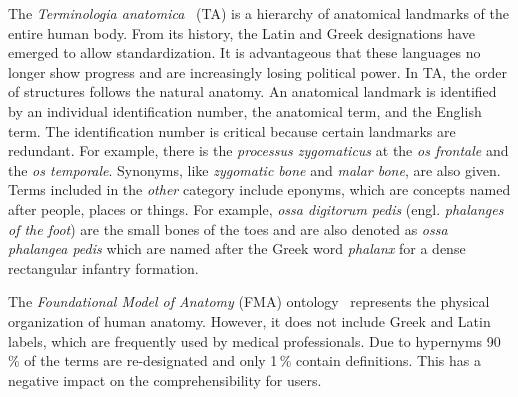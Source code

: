 \documentclass[sw]{iosart2x}
\begin{document}
The \emph{Terminologia anatomica}~\citep{ta2} (TA) is a hierarchy of anatomical landmarks of the entire human body.
From its history, the Latin and Greek designations have emerged to allow standardization.
It is advantageous that these languages no longer show progress and are increasingly losing political power. 
In TA, the order of structures follows the natural anatomy.
An anatomical landmark is identified by an individual identification number, the anatomical term, and the English term.
The identification number is critical because certain landmarks are redundant.
For example, there is the \emph{processus zygomaticus} at the \emph{os frontale} and the \emph{os temporale}.
Synonyms, like \emph{zygomatic bone} and \emph{malar bone}, are also given.
Terms included in the \emph{other} category include eponyms, which are concepts named after people, places or things.
For example, \emph{ossa digitorum pedis} (engl. \emph{phalanges of the foot}) are the small bones of the toes and are also denoted as \emph{ossa phalangea pedis} which are named after the Greek word \emph{phalanx} for a dense rectangular infantry formation.

The \emph{Foundational Model of Anatomy} (FMA) ontology~\citep{fma} represents the physical organization of human anatomy.
However, it does not include Greek and Latin labels, which are frequently used by medical professionals.
Due to hypernyms 90\,\% of the terms are re-designated and only 1\,\% contain definitions.
This has a negative impact on the comprehensibility for users.
\end{document}
